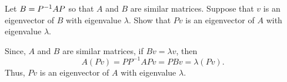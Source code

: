 \documentclass{ximera}
\begin{document}
\begin{exercise} \label{c6.5.4}
Let $B=P^{-1} AP$ so that $A$ and $B$ are similar matrices.  Suppose
that $v$ is an eigenvector of $B$ with eigenvalue $\lambda$.  Show
that $Pv$ is an eigenvector of $A$ with eigenvalue $\lambda$.

\begin{solution}

Since, $A$ and $B$ are similar matrices, if $Bv = \lambda v$, then
\[ A(Pv) = PP^{-1}APv = PBv = \lambda (Pv). \]
Thus, $Pv$ is an eigenvector of $A$ with eigenvalue $\lambda$.

\end{solution}
\end{exercise}
\end{document}
